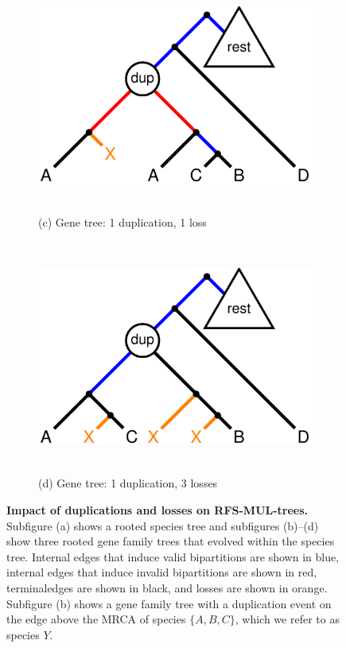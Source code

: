 \begin{figure}[!h]
	\begin{subfigure}[t]{0.4\textwidth}
	\centering
		\includegraphics[width=\textwidth]{figures/fastmulrfs-fig2c.pdf}
		~
		\caption{(c) Gene tree: 1 duplication, 1 loss} 
	\end{subfigure}
	~~~~~~~~~~
	\begin{subfigure}[t]{0.4\textwidth}
	\centering
		\includegraphics[width=\textwidth]{figures/fastmulrfs-fig2d.pdf}
		~
		\caption{(d) Gene tree: 1 duplication, 3 losses} 
	\end{subfigure}
	\caption{
	{\bf Impact of duplications and losses on RFS-MUL-trees.}
Subfigure (a) shows a rooted species tree and subfigures (b)--(d) show three rooted gene family trees that evolved within the species tree.
Internal edges that induce valid bipartitions are shown in blue, internal edges that induce invalid bipartitions are shown in red, \glspl{terminaledge} are shown in black, and losses are shown in orange.
Subfigure (b) shows a gene family tree with a duplication event on the edge above the MRCA of species $\{ A, B, C \}$, which we refer to as species $Y$. 
}
\end{figure}
